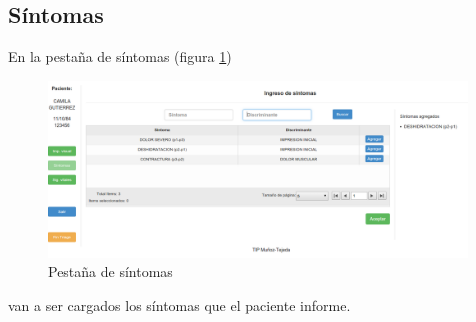 \subsection{Síntomas}
En la pestaña de síntomas (figura \ref{fig:sintomas})
\begin{figure}
\centerline{\includegraphics[width=0.99\textwidth]{sintomas.png}}
\caption{Pestaña de síntomas} \label{fig:sintomas}
\end{figure}
van a ser cargados los síntomas que el paciente informe. 

